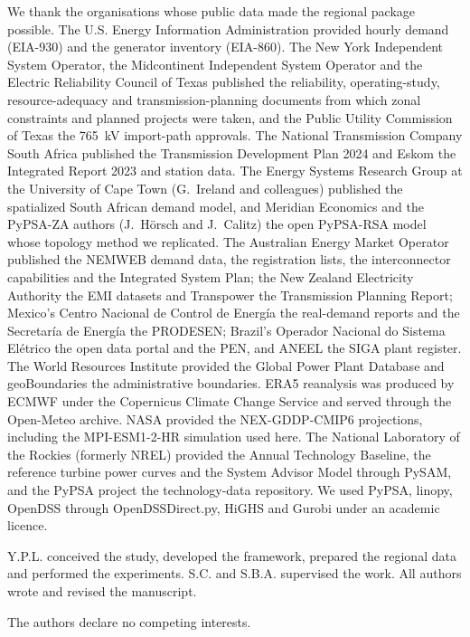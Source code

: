 \documentclass[pdflatex,sn-nature]{sn-jnl}
\begin{document}
We thank the organisations whose public data made the regional package possible. The U.S. Energy Information Administration provided hourly demand (EIA-930) and the generator inventory (EIA-860). The New York Independent System Operator, the Midcontinent Independent System Operator and the Electric Reliability Council of Texas published the reliability, operating-study, resource-adequacy and transmission-planning documents from which zonal constraints and planned projects were taken, and the Public Utility Commission of Texas the 765~kV import-path approvals. The National Transmission Company South Africa published the Transmission Development Plan 2024 and Eskom the Integrated Report 2023 and station data. The Energy Systems Research Group at the University of Cape Town (G.~Ireland and colleagues) published the spatialized South African demand model, and Meridian Economics and the PyPSA-ZA authors (J.~H\"orsch and J.~Calitz) the open PyPSA-RSA model whose topology method we replicated. The Australian Energy Market Operator published the NEMWEB demand data, the registration lists, the interconnector capabilities and the Integrated System Plan; the New Zealand Electricity Authority the EMI datasets and Transpower the Transmission Planning Report; Mexico's Centro Nacional de Control de Energ\'ia the real-demand reports and the Secretar\'ia de Energ\'ia the PRODESEN; Brazil's Operador Nacional do Sistema El\'etrico the open data portal and the PEN, and ANEEL the SIGA plant register. The World Resources Institute provided the Global Power Plant Database and geoBoundaries the administrative boundaries. ERA5 reanalysis was produced by ECMWF under the Copernicus Climate Change Service and served through the Open-Meteo archive. NASA provided the NEX-GDDP-CMIP6 projections, including the MPI-ESM1-2-HR simulation used here. The National Laboratory of the Rockies (formerly NREL) provided the Annual Technology Baseline, the reference turbine power curves and the System Advisor Model through PySAM, and the PyPSA project the technology-data repository. We used PyPSA, linopy, OpenDSS through OpenDSSDirect.py, HiGHS and Gurobi under an academic licence.



Y.P.L. conceived the study, developed the framework, prepared the regional data and performed the experiments. S.C. and S.B.A. supervised the work. All authors wrote and revised the manuscript.

The authors declare no competing interests.
\end{document}
